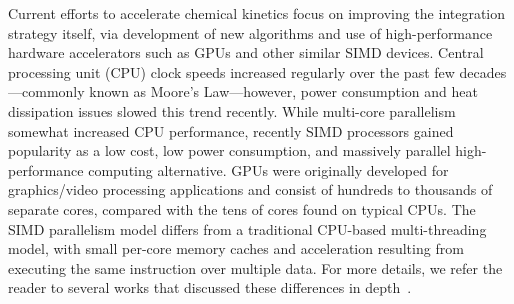 \documentclass[preprint]{elsarticle}
\begin{document}
Current efforts to accelerate chemical kinetics focus on improving the integration strategy itself, via development of new algorithms and use of high-performance hardware accelerators such as GPUs and other similar SIMD devices.
Central processing unit (CPU) clock speeds increased regularly over the past few decades---commonly known as Moore's Law---however, power consumption and heat dissipation issues slowed this trend recently.
While multi-core parallelism somewhat increased CPU performance, recently SIMD processors gained popularity as a low cost, low power consumption, and massively parallel high-performance computing alternative.
GPUs were originally developed for graphics\slash video processing applications and consist of hundreds to thousands of separate cores, compared with the tens of cores found on typical CPUs.
The SIMD parallelism model differs from a traditional CPU-based multi-threading model, with small per-core memory caches and acceleration resulting from executing the same instruction over multiple data.
For more details, we refer the reader to several works that discussed these differences in depth~\cite{Cruz:2011gc,Brodtkorb:2013hn,Niemeyer:2014hn}.
\end{document}
